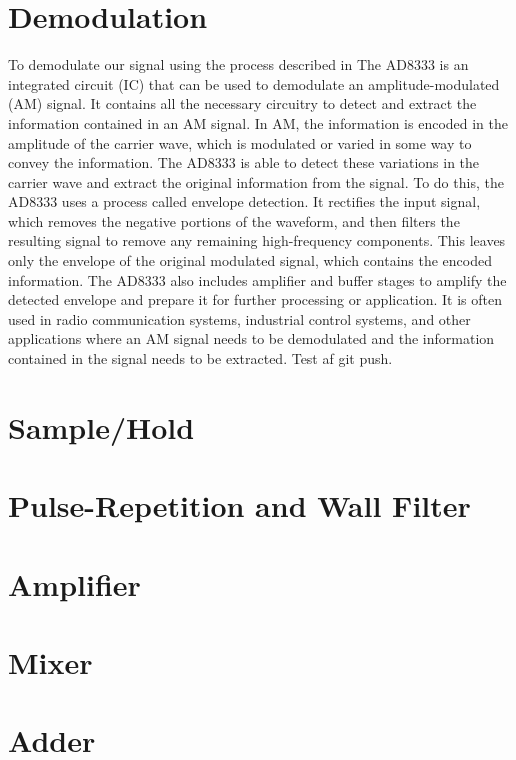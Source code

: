 \section{Demodulation}
To demodulate our signal using the process described in The AD8333\cite{AD8333} is an integrated circuit (IC) that can be used to demodulate an amplitude-modulated (AM) signal. It contains all the necessary circuitry to detect and extract the information contained in an AM signal. In AM, the information is encoded in the amplitude of the carrier wave, which is modulated or varied in some way to convey the information. The AD8333 is able to detect these variations in the carrier wave and extract the original information from the signal. To do this, the AD8333 uses a process called envelope detection. It rectifies the input signal, which removes the negative portions of the waveform, and then filters the resulting signal to remove any remaining high-frequency components. This leaves only the envelope of the original modulated signal, which contains the encoded information. The AD8333 also includes amplifier and buffer stages to amplify the detected envelope and prepare it for further processing or application. It is often used in radio communication systems, industrial control systems, and other applications where an AM signal needs to be demodulated and the information contained in the signal needs to be extracted. Test af git push.
\section{Sample/Hold}

\section{Pulse-Repetition and Wall Filter}

\section{Amplifier}

\section{Mixer}

\section{Adder}